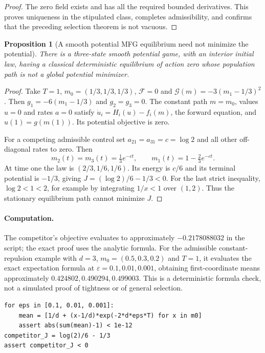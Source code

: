 \documentclass[11pt,a4paper]{article}
\newtheorem{proposition}[theorem]{Proposition}
\theoremstyle{definition}
\theoremstyle{remark}
\begin{document}
\begin{proof}
The zero field exists and has all the required bounded derivatives. This proves uniqueness in the stipulated class, completes admissibility, and confirms that the preceding selection theorem is not vacuous.
\end{proof}

\begin{proposition}[A smooth potential MFG equilibrium need not minimize the potential]
There is a three-state smooth potential game, with an interior initial law, having a classical deterministic equilibrium of action zero whose population path is not a global potential minimizer.
\end{proposition}
\begin{proof}
Take $T=1$, $m_0=(1/3,1/3,1/3)$, $\mathcal F=0$ and
$\mathcal G(m)=-3(m_1-1/3)^2$. Then $g_1=-6(m_1-1/3)$ and $g_2=g_3=0$. The constant path $m=m_0$, values $u=0$ and rates $a=0$ satisfy $\dot u_i=H_i(u)-f_i(m)$, the forward equation, and $u(1)=g(m(1))$. Its potential objective is zero.

For a competing admissible control set $a_{21}=a_{31}=c=\log2$ and all other off-diagonal rates to zero. Then
\[
 m_2(t)=m_3(t)=\tfrac13e^{-ct},\qquad m_1(t)=1-\tfrac23e^{-ct}.
\]
At time one the law is $(2/3,1/6,1/6)$. Its energy is $c/6$ and its terminal potential is $-1/3$, giving
$J=(\log2)/6-1/3<0$.
For the last strict inequality, $\log2<1<2$, for example by integrating $1/x<1$ over $(1,2)$. Thus the stationary equilibrium path cannot minimize $J$.
\end{proof}

\paragraph{Computation.}
The competitor's objective evaluates to approximately $-0.2178088032$ in the script; the exact proof uses the analytic formula. For the admissible constant-repulsion example with $d=3$, $m_0=(0.5,0.3,0.2)$ and $T=1$, it evaluates the exact expectation formula at $\varepsilon=0.1,0.01,0.001$, obtaining first-coordinate means approximately $0.424802,0.490294,0.499003$. This is a deterministic formula check, not a simulated proof of tightness or of general selection.
\begin{lstlisting}
for eps in [0.1, 0.01, 0.001]:
    mean = [1/d + (x-1/d)*exp(-2*d*eps*T) for x in m0]
    assert abs(sum(mean)-1) < 1e-12
competitor_J = log(2)/6 - 1/3
assert competitor_J < 0
\end{lstlisting}
\end{document}
